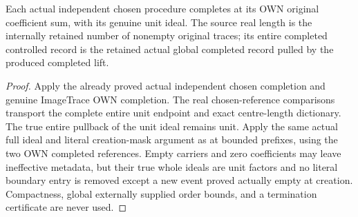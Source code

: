 \begin{theorem}
\label{hir:submersion-choice-image-trace-own-completion}
\leanok
{}

Each actual independent chosen procedure completes at its OWN original coefficient sum, with its genuine unit ideal. The source real length is the internally retained number of nonempty original traces; its entire completed controlled record is the retained actual global completed record pulled by the produced completed lift.
\end{theorem}
\begin{proof}
Apply the already proved actual independent chosen completion and genuine ImageTrace OWN completion. The real chosen-reference comparisons transport the complete entire unit endpoint and exact centre-length dictionary. The true entire pullback of the unit ideal remains unit. Apply the same actual full ideal and literal creation-mask argument as at bounded prefixes, using the two OWN completed references. Empty carriers and zero coefficients may leave ineffective metadata, but their true whole ideals are unit factors and no literal boundary entry is removed except a new event proved actually empty at creation. Compactness, global externally supplied order bounds, and a termination certificate are never used.
\end{proof}

